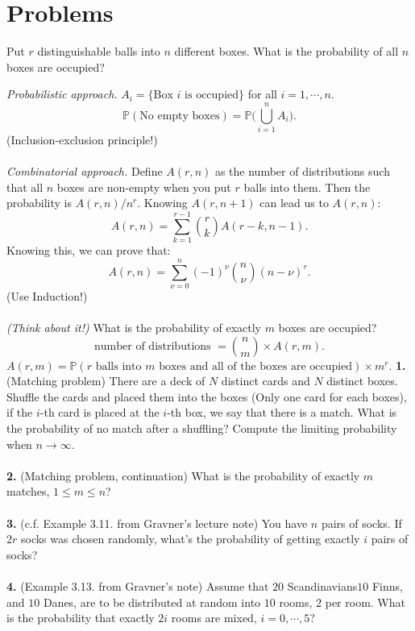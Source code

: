 \section{Problems}
\begin{exercise}
    Put $r$ distinguishable balls into $n$ different boxes. What is the probability of all $n$ boxes are occupied?
\end{exercise}
\textit{Probabilistic approach.} $A_i=\{\text{Box $i$ is occupied}\}$ for all $i=1,\cdots, n$.
\begin{equation}
\mathbb{P}(\text{No empty boxes}) = \mathbb{P}\Big(\bigcup_{i=1}^n A_i\Big).
\end{equation}
(Inclusion-exclusion principle!)\\ \\
\textit{Combinatorial approach.} Define $A(r,n)$ as the number of distributions such that all $n$ boxes are non-empty when you put $r$ balls into them. Then the probability is $A(r,n)/n^r$. Knowing $A(r,n+1)$ can lead us to $A(r,n)$:
\begin{equation}
A(r,n) = \sum_{k=1}^{r-1}\binom{r}{k}A(r-k,n-1).
\end{equation}
Knowing this, we can prove that:
\begin{equation}
A(r,n) = \sum_{\nu = 0}^n(-1)^\nu\binom{n}{\nu}(n-\nu)^r.
\end{equation}
(Use Induction!)\\ \\
\textit{(Think about it!)} What is the probability of exactly $m$ boxes are occupied?
\begin{equation}
\text{number of distributions }= \binom{n}{m}\times A(r,m).
\end{equation}
$A(r,m) = \mathbb{P}(\text{$r$ balls into $m$ boxes and all of the boxes are occupied})\times m^r$.
\newpage
\textbf{1.}(Matching problem) There are a deck of $N$ distinct cards and $N$ distinct boxes. Shuffle the cards and placed them into the boxes (Only one card for each boxes), if the $i$-th card is placed at the $i$-th box, we say that there is a match. What is the probability of no match after a shuffling? Compute the limiting probability when $n\rightarrow\infty$.\\ \\
\textbf{2. }(Matching problem, continuation) What is the probability of exactly $m$ matches, $1\leq m\leq n$?\\ \\
\textbf{3. }(c.f. Example 3.11. from Gravner's lecture note) You have $n$ pairs of socks. If $2r$ socks was chosen randomly, what's the probability of getting exactly $i$ pairs of socks?\\ \\
\textbf{4. }(Example 3.13. from Gravner's note) Assume that $20$ Scandinavians$10$ Finns, and $10$ Danes, are to be distributed at random into $10$ rooms, $2$ per room. What is the probability that exactly $2i$ rooms are mixed, $i = 0,\cdots,5$?\\ \\